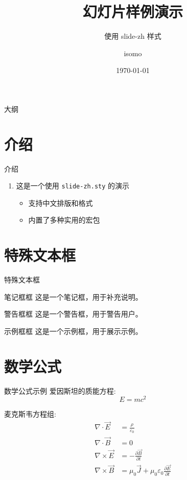 \documentclass{beamer}
\title{幻灯片样例演示}
\subtitle{使用 slide-zh 样式}
\author{isomo}
\date{\today}
\begin{document}
\begin{frame}
  \titlepage
\end{frame}

\begin{frame}{大纲}
  \tableofcontents
\end{frame}

\section{介绍}
\begin{frame}{介绍}
  \begin{enumerate}
    \item 这是一个使用 \texttt{slide-zh.sty} 的演示
    \begin{itemize}
        \item 支持中文排版和格式
        \item 内置了多种实用的宏包
    \end{itemize}
  \end{enumerate}
\end{frame}

\section{特殊文本框}
\begin{frame}{特殊文本框}
  \begin{block}{笔记框框}
    这是一个笔记框，用于补充说明。
  \end{block}
  \begin{alertblock}{警告框框}
    这是一个警告框，用于警告用户。
  \end{alertblock}
  \begin{exampleblock}{示例框框}
    这是一个示例框，用于展示示例。
  \end{exampleblock}
\end{frame}

\section{数学公式}
\begin{frame}{数学公式示例}
  爱因斯坦的质能方程:
  \begin{equation}
    E = mc^2
  \end{equation}

  麦克斯韦方程组:
  \begin{align}
    \nabla \cdot \vec{E} &= \frac{\rho}{\varepsilon_0} \\
    \nabla \cdot \vec{B} &= 0 \\
    \nabla \times \vec{E} &= -\frac{\partial \vec{B}}{\partial t} \\
    \nabla \times \vec{B} &= \mu_0\vec{J} + \mu_0\varepsilon_0\frac{\partial \vec{E}}{\partial t}
  \end{align}
\end{frame}
\end{document}
